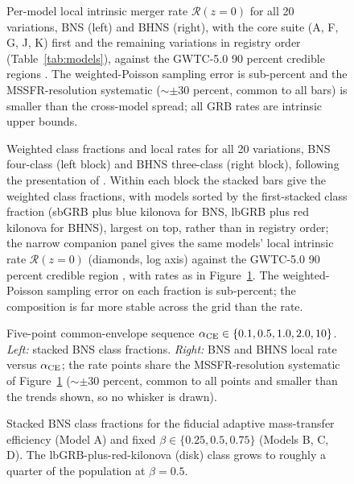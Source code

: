 \documentclass[twocolumn,amsmath]{aastex702}
\newcommand{\Rzero}{\mathcal{R}(z{=}0)}
\begin{document}
\begin{figure}[tbp]
\caption{Per-model local intrinsic merger rate $\Rzero$ for all 20
\citet{broekgaarden2021} variations, BNS (left) and BHNS (right), with the core
suite (A, F, G, J, K) first and the remaining variations in registry order
(Table~\ref{tab:models}), against the GWTC-5.0 90 percent credible regions
\citep[shaded]{abac2026}. The weighted-Poisson sampling error is sub-percent and
the MSSFR-resolution systematic ($\sim \pm 30$ percent, common to all bars) is
smaller than the cross-model spread; all GRB rates are intrinsic upper bounds.
\label{fig:rate20}}
\end{figure}

\begin{figure}[tbp]
\caption{Weighted \citet{gottlieb2024} class fractions and local rates for
all 20 \citet{broekgaarden2021} variations, BNS four-class (left block) and
BHNS three-class (right block), following the presentation of
\citet{broekgaarden2026}. Within each block the stacked bars give the
weighted class fractions, with models sorted by the first-stacked class
fraction (sbGRB plus blue kilonova for BNS, lbGRB plus red kilonova for
BHNS), largest on top, rather than in registry order; the narrow companion
panel gives the same models' local intrinsic rate $\Rzero$ (diamonds, log
axis) against the GWTC-5.0 90 percent credible region
\citep[shaded]{abac2026}, with rates as in Figure~\ref{fig:rate20}. The
weighted-Poisson sampling error on each fraction is sub-percent; the
composition is far more stable across the grid than the rate.
\label{fig:frac20}}
\end{figure}

\begin{figure}[tbp]
\caption{Five-point common-envelope sequence $\alpha_{\rm CE} \in \{0.1, 0.5,
1.0, 2.0, 10\}$. \textit{Left:} stacked BNS class fractions.
\textit{Right:} BNS and BHNS local rate versus $\alpha_{\rm CE}$; the
rate points share the MSSFR-resolution systematic of Figure~\ref{fig:rate20}
($\sim \pm 30$ percent, common to all points and smaller than the trends shown,
so no whisker is drawn).
\label{fig:alphace5}}
\end{figure}

\begin{figure}[tbp]
\caption{Stacked BNS class fractions for the fiducial adaptive mass-transfer
efficiency (Model A) and fixed $\beta \in \{0.25, 0.5, 0.75\}$ (Models B, C, D).
The lbGRB-plus-red-kilonova (disk) class grows to roughly a quarter of the
population at $\beta = 0.5$. \label{fig:betasweep}}
\end{figure}
\end{document}

